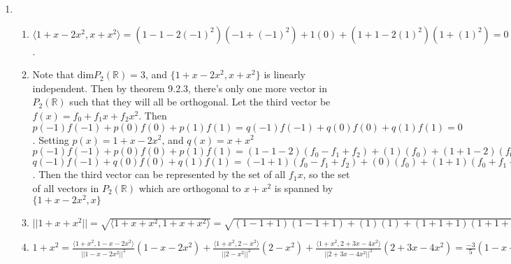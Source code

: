 \documentclass[10pt,english]{article}
\begin{document}
\begin{enumerate}
\begin{enumerate}
    \item On $P_2(\mathbb{R}),\langle p(x),q(x)\rangle=p(-1)q(1)+p(0)q(0)+p(1)q(-1)$. Let $p(x)=p_0+p_1x+p_2x^2,q(x)=q_0+q_1x+q_2x^2,r(x)=r_0+r_1x+r_2x^2$. \\ 
    $\langle p(x),p(x)\rangle=p(-1)p(1)^2+p(0)^2=(p_0-p_1+p_2)^2+p_0^2$. Note that this is always greater than zero, with it only being equal to zero when $p_0=p_1=p_2=0$. Thus, $\langle p(x),q(x)\rangle$ is positive definite. \\ 
    $\langle p(x),q(x)\rangle=p(−1)q(1)+p(0)q(0)+p(1)q(−1)=q(-1)p(1)+q(0)p(0)+q(1)p(-1)=\langle q(x),p(x)\rangle$, so it is symmetric. \\ 
    Note that $ap(x)+bq(x)=a(p_0+p_1x+p_2x^2)+b(q_0+q_1x+q_2x^2)=ap_0+bq_0+(ap_1+bq_1)x+(ap_2+bq_2)x^2$. Then $\langle ap(x)+bq(x),r(x)\rangle=(ap_0+bq_0-(ap_1+bq_1)+(ap_2+bq_2))(c_0+c_1+c_2)+(ap_0+bq_0)c_0+(ap_0+bq_0+(ap_1+bq_1)+(ap_2+bq_2))(c_0-c_1+c_2)=a(3c_0p_0+2c_2p_0-2c_1p_1+2c_0ap_2+2c_2p_2)+b(3c_0q_0+2c_0q_2-c_1q_1+2c_2q_0+2c_2q_2)=a\langle p(x),c(x)\rangle+b\langle q(x),c(x)\rangle$. Then $\langle p(x),q(x)\rangle$ is left linear, and so it is an inner product space. 
\end{enumerate}

\pagebreak
\item \begin{enumerate}
    \item $\langle1+x-2x^2,x+x^2\rangle=(1-1-2(-1)^2)(-1+(-1)^2)+1(0)+(1+1-2(1)^2)(1+(1)^2)=0+0+0=0$. 
    \item Note that $\text{dim}P_2(\mathbb{R})=3$, and $\{1+x-2x^2,x+x^2\}$ is linearly independent. Then by theorem 9.2.3, there's only one more vector in $P_2(\mathbb{R})$ such that they will all be orthogonal. Let the third vector be $f(x)=f_0+f_1x+f_2x^2$. Then $p(-1)f(-1)+p(0)f(0)+p(1)f(1)=q(-1)f(-1)+q(0)f(0)+q(1)f(1)=0$. Setting $p(x)=1+x-2x^2$, and $q(x)=x+x^2$ \\ 
    $p(-1)f(-1)+p(0)f(0)+p(1)f(1)=(1-1-2)(f_0-f_1+f_2)+(1)(f_0)+(1+1-2)(f_0+f_1+f_2)=-2(f_0-f_1+f_2)+f_0$ \\ 
    $q(-1)f(-1)+q(0)f(0)+q(1)f(1)=(-1+1)(f_0-f_1+f_2)+(0)(f_0)+(1+1)(f_0+f_1+f_2)=2(f_0+f_1+f_2)=-2(f_0-f_1+f_2)+f_0\Rightarrow f_0=f_2=0$. Then the third vector can be represented by the set of all $f_1x$, so the set of all vectors in $P_2(\mathbb{R})$ which are orthogonal to $x+x^2$ is spanned by $\{1+x-2x^2,x\}$
    \item $||1+x+x^2||=\sqrt{\langle 1+x+x^2,1+x+x^2\rangle}=\sqrt{(1-1+1)(1-1+1)+(1)(1)+(1+1+1)(1+1+1)}=\sqrt{1+1+9}=\sqrt{11}$
    \item $1+x^2=\frac{\langle1+x^2,1-x-2x^2\rangle}{||1-x-2x^2||^2}(1-x-2x^2)+\frac{\langle1+x^2,2-x^2\rangle}{||2-x^2||^2}(2-x^2)+\frac{\langle1+x^2,2+3x-4x^2\rangle}{||2+3x-4x^2||^2}(2+3x-4x^2)=\frac{-3}{5}(1-x-2x^2)+\frac{6}{6}(2-x^2)+\frac{-6}{30}(2+3x-4x^2)=\frac{-3}{5}(1-x-2x^2)+(2-x^2)+\frac{-1}{5}(2+3x-4x^2)$
\end{enumerate}


\end{enumerate}
\end{document}
